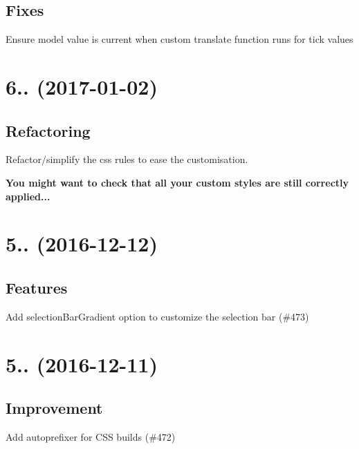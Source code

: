 \subsection*{Fixes}


\begin{DoxyItemize}
\item Ensure model value is current when custom translate function runs for tick values
\end{DoxyItemize}

\section*{6.. (2017-\/01-\/02)}

\subsection*{Refactoring}


\begin{DoxyItemize}
\item Refactor/simplify the css rules to ease the customisation.
\end{DoxyItemize}

{\bfseries You might want to check that all your custom styles are still correctly applied...}

\section*{5.. (2016-\/12-\/12)}

\subsection*{Features}


\begin{DoxyItemize}
\item Add selection\+Bar\+Gradient option to customize the selection bar (\#473)
\end{DoxyItemize}

\section*{5.. (2016-\/12-\/11)}

\subsection*{Improvement}


\begin{DoxyItemize}
\item Add autoprefixer for C\+SS builds (\#472)
\end{DoxyItemize}

